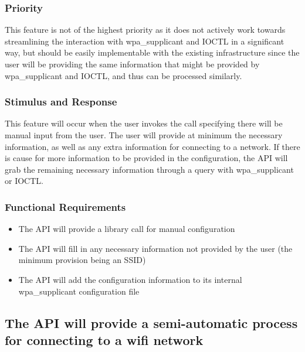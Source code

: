 \subsubsection{Priority}
This feature is not of the highest priority as it does not actively work towards streamlining
the interaction with wpa\_supplicant and IOCTL in a significant way, but should be easily 
implementable with the existing infrastructure since the user will be providing the same
information that might be provided by wpa\_supplicant and IOCTL, and thus can be processed
similarly.

\subsubsection{Stimulus and Response}
This feature will occur when the user invokes the call specifying there will be
manual input from the user. The user will provide at minimum the necessary information,
as well as any extra information for connecting to a network. If there is cause for more
information to be provided in the configuration, the API will grab the remaining necessary
information through a query with wpa\_supplicant or IOCTL.

\subsubsection{Functional Requirements}

\begin{itemize}
  \item The API will provide a library call for manual configuration
  \item The API will fill in any necessary information not provided by the user
    (the minimum provision being an SSID)
  \item The API will add the configuration information to its internal wpa\_supplicant
    configuration file
\end{itemize}


\subsection{The API will provide a semi-automatic process for connecting to a wifi network}
